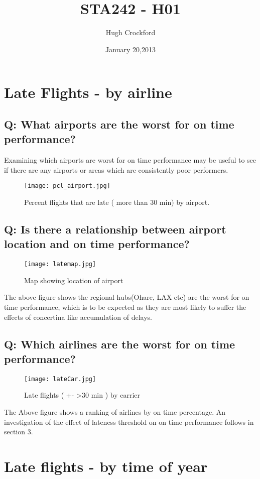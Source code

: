 \documentclass[12pt]{article}
\title{STA242 - H01}
\author{Hugh Crockford}
\date{January 20,2013}
\begin{document}
	\maketitle
	\tableofcontents
	\clearpage
	\section{Late Flights - by airline }
	\subsection{Q: What airports are the worst for on time performance?}
		Examining which airports are worst for on time performance may be useful to see if there are any airports or areas which are consistently poor performers.
		\begin{figure}[h!b]
			\centering
			\texttt{[image: pcl\_airport.jpg]}
			\caption{Percent flights that are late ( more than 30 min) by airport. }
		\end{figure}
	\newpage
	\subsection{Q: Is there a relationship between airport location and on time performance?}
		\begin{figure}[h!]
			\centering
			\texttt{[image: latemap.jpg]}
			\caption{Map showing location of airport}
		\end{figure}
		The above figure shows the regional hubs(Ohare, LAX etc)  are the worst for on time performance, which is to be expected as they are most likely to suffer the effects of concertina like accumulation of delays.
	\newpage
	\subsection{Q: Which airlines are the worst for on time performance?}
	\begin{figure}[h!]
		\centering
		\texttt{[image: lateCar.jpg]}
		\caption{Late flights ( +- >30 min ) by carrier}
	\end{figure}
	The Above figure shows a ranking of airlines by on time percentage.
	An investigation of the effect of lateness threshold on on time performance follows in section 3.
 	\newpage 
	\section{Late flights - by time of year}
\end{document}
